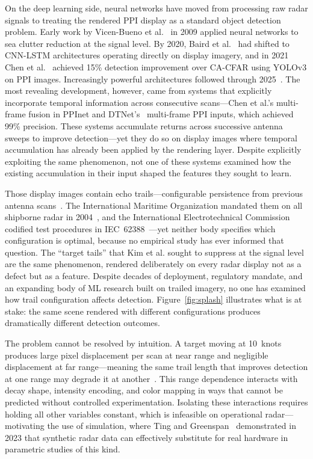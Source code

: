 \documentclass[twocolumn, 10pt]{article}
\begin{document}
On the deep learning side, neural networks have moved from processing raw radar signals to treating the rendered PPI display as a standard object detection problem. Early work by Vicen-Bueno et al.~\cite{VicenBueno2009Neural} in 2009 applied neural networks to sea clutter reduction at the signal level. By 2020, Baird et al.~\cite{Baird2020CNNLSTM} had shifted to CNN-LSTM architectures operating directly on display imagery, and in 2021 Chen et al.~\cite{Chen2021PPInet} achieved 15\% detection improvement over CA-CFAR using YOLOv3 on PPI images. Increasingly powerful architectures followed through 2025~\cite{Wang2023SALALSTM, Yin2023SWFormer, Jia2025YOLOv11OBB}. The most revealing development, however, came from systems that explicitly incorporate temporal information across consecutive scans---Chen et al.'s multi-frame fusion in PPInet and DTNet's~\cite{DTNet2025MultiFrame} multi-frame PPI inputs, which achieved 99\% precision. These systems accumulate returns across successive antenna sweeps to improve detection---yet they do so on display images where temporal accumulation has already been applied by the rendering layer. Despite explicitly exploiting the same phenomenon, not one of these systems examined how the existing accumulation in their input shaped the features they sought to learn.

Those display images contain echo trails---configurable persistence from previous antenna scans~\cite{Briggs2004RadarDisplay}. The International Maritime Organization mandated them on all shipborne radar in 2004~\cite{IMO2004MSC192}, and the International Electrotechnical Commission codified test procedures in IEC~62388~\cite{IEC2013Radar}---yet neither body specifies which configuration is optimal, because no empirical study has ever informed that question. The ``target tails'' that Kim et al. sought to suppress at the signal level are the same phenomenon, rendered deliberately on every radar display not as a defect but as a feature. Despite decades of deployment, regulatory mandate, and an expanding body of ML research built on trailed imagery, no one has examined how trail configuration affects detection. Figure~\ref{fig:splash} illustrates what is at stake: the same scene rendered with different configurations produces dramatically different detection outcomes.

The problem cannot be resolved by intuition. A target moving at 10~knots produces large pixel displacement per scan at near range and negligible displacement at far range---meaning the same trail length that improves detection at one range may degrade it at another~\cite{Chen2022VisibilityGraph}. This range dependence interacts with decay shape, intensity encoding, and color mapping in ways that cannot be predicted without controlled experimentation. Isolating these interactions requires holding all other variables constant, which is infeasible on operational radar---motivating the use of simulation, where Ting and Greenspan~\cite{Ting2023SyntheticRadar} demonstrated in 2023 that synthetic radar data can effectively substitute for real hardware in parametric studies of this kind.
\end{document}
